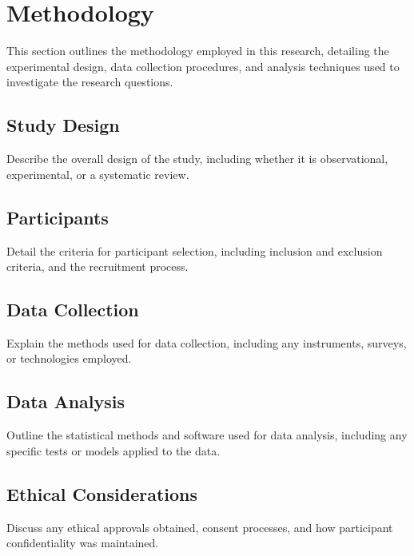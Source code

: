 
\section{Methodology}

This section outlines the methodology employed in this research, detailing the experimental design, data collection procedures, and analysis techniques used to investigate the research questions.

\subsection{Study Design}
Describe the overall design of the study, including whether it is observational, experimental, or a systematic review.

\subsection{Participants}
Detail the criteria for participant selection, including inclusion and exclusion criteria, and the recruitment process.

\subsection{Data Collection}
Explain the methods used for data collection, including any instruments, surveys, or technologies employed.

\subsection{Data Analysis}
Outline the statistical methods and software used for data analysis, including any specific tests or models applied to the data.

\subsection{Ethical Considerations}
Discuss any ethical approvals obtained, consent processes, and how participant confidentiality was maintained.